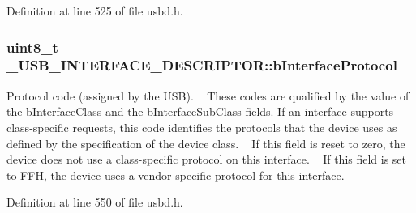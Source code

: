 Definition at line 525 of file usbd.\+h.

\subsubsection[{\texorpdfstring{b\+Interface\+Protocol}{bInterfaceProtocol}}]{\setlength{\rightskip}{0pt plus 5cm}uint8\+\_\+t \+\_\+\+U\+S\+B\+\_\+\+I\+N\+T\+E\+R\+F\+A\+C\+E\+\_\+\+D\+E\+S\+C\+R\+I\+P\+T\+O\+R\+::b\+Interface\+Protocol}\hypertarget{struct__USB__INTERFACE__DESCRIPTOR_a12f09e3be7c323bbd776f75af515ec7f}{}\label{struct__USB__INTERFACE__DESCRIPTOR_a12f09e3be7c323bbd776f75af515ec7f}
Protocol code (assigned by the U\+SB). ~\newline
These codes are qualified by the value of the b\+Interface\+Class and the b\+Interface\+Sub\+Class fields. If an interface supports class-\/specific requests, this code identifies the protocols that the device uses as defined by the specification of the device class. ~\newline
If this field is reset to zero, the device does not use a class-\/specific protocol on this interface. ~\newline
If this field is set to F\+FH, the device uses a vendor-\/specific protocol for this interface. 

Definition at line 550 of file usbd.\+h.

